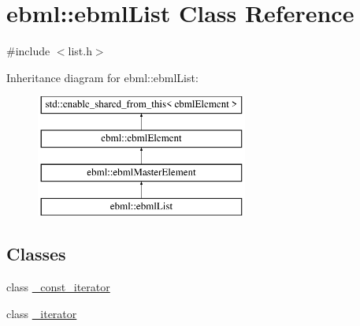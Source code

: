 \hypertarget{classebml_1_1ebmlList}{}\section{ebml\+:\+:ebml\+List Class Reference}
\label{classebml_1_1ebmlList}


{\ttfamily \#include $<$list.\+h$>$}

Inheritance diagram for ebml\+:\+:ebml\+List\+:\begin{figure}[H]
\begin{center}
\leavevmode
\includegraphics[height=4.000000cm]{classebml_1_1ebmlList}
\end{center}
\end{figure}
\subsection*{Classes}
\begin{DoxyCompactItemize}
\item 
class \mbox{\hyperlink{classebml_1_1ebmlList_1_1__const__iterator}{\+\_\+const\+\_\+iterator}}
\item 
class \mbox{\hyperlink{classebml_1_1ebmlList_1_1__iterator}{\+\_\+iterator}}
\end{DoxyCompactItemize}
